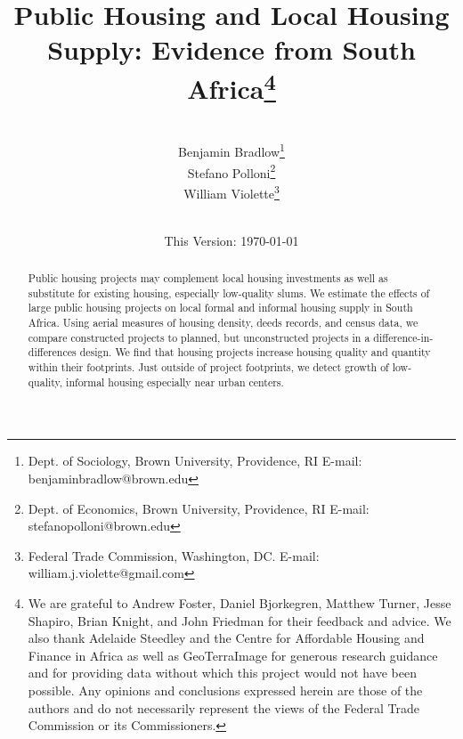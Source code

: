 \documentclass[12pt]{article}
\begin{document}
\begin{titlepage} 
\title{{Public Housing and Local Housing Supply: Evidence from South Africa}\thanks{We are grateful to Andrew Foster, Daniel Bjorkegren, Matthew Turner, Jesse Shapiro, Brian Knight, and John Friedman for their feedback and advice.  We also thank Adelaide Steedley and the Centre for Affordable Housing and Finance in Africa as well as GeoTerraImage for generous research guidance and for providing data without which this project would not have been possible.  Any opinions and conclusions expressed herein are those of the authors and do not necessarily represent the views of the Federal Trade Commission or its Commissioners.}}
\author{\\[3em] Benjamin Bradlow\thanks{Dept. of Sociology, Brown University, Providence, RI  E-mail: benjamin\textunderscore bradlow@brown.edu}\\
 Stefano Polloni\thanks{Dept. of Economics, Brown University, Providence, RI E-mail: stefano\textunderscore polloni@brown.edu}\\ 
  William Violette\thanks{Federal Trade Commission, Washington, DC. E-mail: william.j.violette@gmail.com} \\
 \\ 
  }
\vspace{30mm}
\date{\vspace{5mm}This Version: \today}
\maketitle
\begin{abstract}



	Public housing projects may complement local housing investments as well as substitute for existing housing, especially low-quality slums.  We estimate the effects of large public housing projects on local formal and informal housing supply in South Africa.  Using aerial measures of housing density, deeds records, and census data, we compare constructed projects to planned, but unconstructed projects in a difference-in-differences design.  We find that housing projects increase housing quality and quantity within their footprints.  Just outside of project footprints, we detect growth of low-quality, informal housing especially near urban centers. 




\end{abstract}
\end{titlepage}
\end{document}

